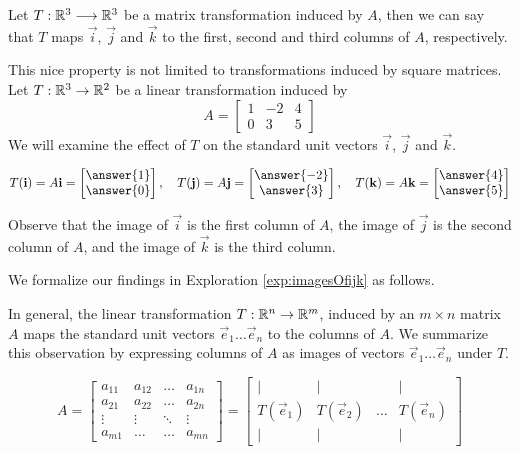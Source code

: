 \documentclass{ximera}
\begin{document}
\begin{exploration}
Let $T:\mathbb{R}^3\longrightarrow\mathbb{R}^3$ be a matrix transformation induced by $A$, then we can say that $T$ maps $\vec{i}$, $\vec{j}$ and $\vec{k}$ to the first, second and third columns of $A$, respectively. 

This nice property is not limited to transformations induced by square matrices.  Let $T:\mathbb{R}^3\rightarrow \mathbb{R}^2$ be a linear transformation induced by
$$A=\begin{bmatrix}1&-2&4\\0&3&5\end{bmatrix}$$
We will examine the effect of $T$ on the standard unit vectors $\vec{i}$, $\vec{j}$ and $\vec{k}$.
 
$$T(\vec{i})=A\vec{i}=\begin{bmatrix}\answer{1}\\\answer{0}\end{bmatrix},\quad T(\vec{j})=A\vec{j}=\begin{bmatrix}\answer{-2}\\\answer{3}\end{bmatrix}, \quad
T(\vec{k})=A\vec{k}=\begin{bmatrix}\answer{4}\\\answer{5}\end{bmatrix}$$
 
Observe that the image of $\vec{i}$ is the first column of $A$, the image of $\vec{j}$ is the second column of $A$, and the image of $\vec{k}$ is the third column.

\end{exploration}

We formalize our findings in Exploration \ref{exp:imagesOfijk} as follows.
\begin{observation}\label{obs:imagesOfijk}
    In general, the linear transformation $T:\mathbb{R}^n\rightarrow\mathbb{R}^m$, induced by an $m\times n$ matrix $A$ maps the standard unit vectors $\vec{e}_1\ldots \vec{e}_n$ to the columns of $A$.  We summarize this observation by expressing columns of $A$ as images of vectors $\vec{e}_1\ldots \vec{e}_n$ under $T$.
 
  \begin{equation*} \label{eq:matlintransIntro}
 A=\begin{bmatrix}
           a_{11} & a_{12}&\dots&a_{1n}\\
           a_{21}&a_{22} &\dots &a_{2n}\\
        \vdots & \vdots&\ddots &\vdots\\
        a_{m1}&\dots &\dots &a_{mn}
         \end{bmatrix}
         =
         \begin{bmatrix}
           | & |& &|\\
        T(\vec{e}_1) & T(\vec{e}_2)&\dots &T(\vec{e}_n)\\
        |&| & &|
         \end{bmatrix}
\end{equation*}
\end{observation}
\end{document}
